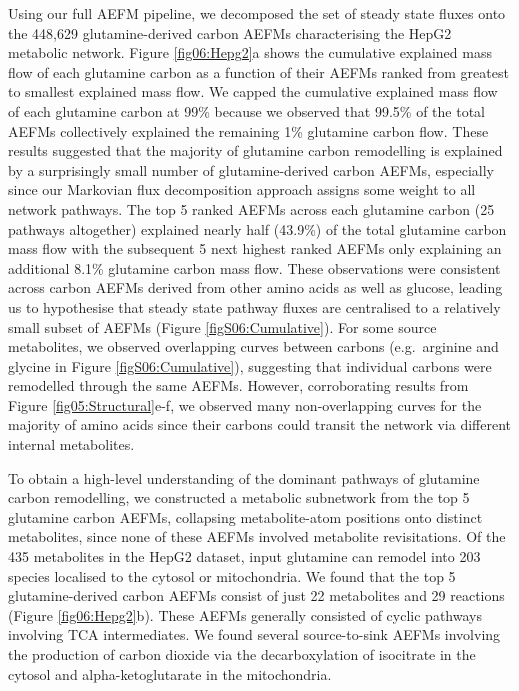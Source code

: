 \documentclass[12pt]{article}
\begin{document}
Using our full AEFM pipeline, we decomposed the set of steady state fluxes
onto the 448,629 glutamine-derived carbon AEFMs characterising the HepG2
metabolic network. Figure \ref{fig06:Hepg2}a shows the cumulative
explained mass flow of each glutamine carbon as a function of their AEFMs
ranked from greatest to smallest explained mass flow. We capped the
cumulative explained mass flow of each glutamine carbon at 99\% because we
observed that 99.5\% of the total AEFMs collectively explained the
remaining 1\% glutamine carbon flow. These results suggested that the
majority of glutamine carbon remodelling is explained by a surprisingly
small number of glutamine-derived carbon AEFMs, especially since our
Markovian flux decomposition approach assigns some weight to all network
pathways. The top 5 ranked AEFMs across each glutamine carbon (25 pathways
altogether) explained nearly half (43.9\%) of the total glutamine carbon
mass flow with the subsequent 5 next highest ranked AEFMs only explaining
an additional 8.1\% glutamine carbon mass flow. These observations were
consistent across carbon AEFMs derived from other amino acids as well as
glucose, leading us to hypothesise that steady state pathway fluxes are
centralised to a relatively small subset of AEFMs (Figure
\ref{figS06:Cumulative}). For some source metabolites, we observed
overlapping curves between carbons (e.g.\ arginine and glycine in Figure
\ref{figS06:Cumulative}), suggesting that individual carbons were
remodelled through the same AEFMs. However, corroborating results from
Figure \ref{fig05:Structural}e-f, we observed many non-overlapping curves
for the majority of amino acids since their carbons could transit the
network via different internal metabolites.


To obtain a high-level understanding of the dominant pathways of glutamine
carbon remodelling, we constructed a metabolic subnetwork from the top
5 glutamine carbon AEFMs, collapsing metabolite-atom positions onto
distinct metabolites, since none of these AEFMs involved metabolite
revisitations. Of the 435 metabolites in the HepG2 dataset, input
glutamine can remodel into 203 species localised to the cytosol or
mitochondria. We found that the top 5 glutamine-derived carbon AEFMs
consist of just 22 metabolites and 29 reactions (Figure
\ref{fig06:Hepg2}b). These AEFMs generally consisted of cyclic pathways
involving TCA intermediates. We found several source-to-sink AEFMs
involving the production of carbon dioxide via the decarboxylation of
isocitrate in the cytosol and alpha-ketoglutarate in the mitochondria.
\end{document}

